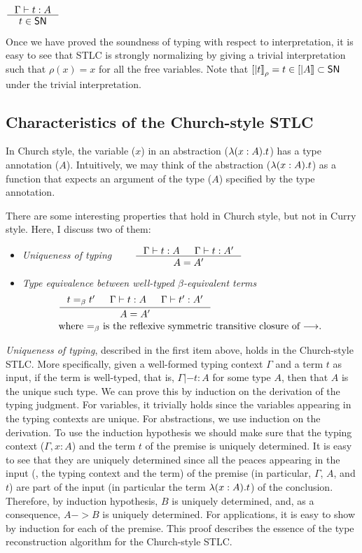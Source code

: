 \begin{corollary}
	$\inference{\Gamma |- t : A}{t \in \SN}$
\end{corollary}
Once we have proved the soundness of typing with respect to interpretation,
it is easy to see that STLC is strongly normalizing by giving a trivial
interpretation such that $\rho(x) = x$ for all the free variables. Note that
$[|t|]_\rho = t \in [|A|] \subset \mathsf{SN}$ under the trivial interpretation.



\subsection{Characteristics of the Church-style STLC}\label{sec:stlc:church}
In Church style, the variable ($x$) in an abstraction
($\lambda(x:A).t$) has a type annotation ($A$). Intuitively, we may think of
the abstraction ($\lambda(x:A).t$) as a function that expects an argument of
the type ($A$) specified by the type annotation.

There are some interesting properties that hold in Church style,
but not in Curry style. Here, I discuss two of them:
\begin{itemize}
\item \emph{Uniqueness of typing}
$\qquad\inference{\Gamma |- t : A & \Gamma |- t : A'}{A = A'} $

\item \emph{Type equivalence between well-typed $\beta$-equivalent terms}
\begin{align*}
& \inference{t =_{\beta} t' & \Gamma |- t : A & \Gamma |- t' : A'}{A = A'} \\
& \text{where $=_{\beta}$ is the reflexive symmetric transitive closure of $-->$.}
\end{align*}
\end{itemize}

\emph{Uniqueness of typing}, described in the first item above,
holds in the Church-style STLC.  More specifically, given
a well-formed typing context $\Gamma$ and a term $t$ as input,
if the term is well-typed, that is, $\Gamma |- t : A$ for some type $A$,
then that $A$ is the unique such type. We can prove this by induction on
the derivation of the typing judgment.
For variables, it trivially holds since the variables appearing in
the typing contexts are unique.
For abstractions, we use induction on the derivation.
To use the induction hypothesis we should make sure that
the typing context ($\Gamma,x:A$) and the term $t$ of the premise
is uniquely determined. It is easy to see that they are uniquely determined
since all the peaces appearing in the input (\ie, the typing context and
the term) of the premise (in particular, $\Gamma$, $A$, and $t$) are
part of the input (in particular the term $\lambda(x:A).t$) of the conclusion.
Therefore, by induction hypothesis, $B$ is uniquely determined, and,
as a consequence, $A -> B$ is uniquely determined.
For applications, it is easy to show by induction for each of the premise.
This proof describes the essence of the type reconstruction algorithm for
the Church-style STLC.


